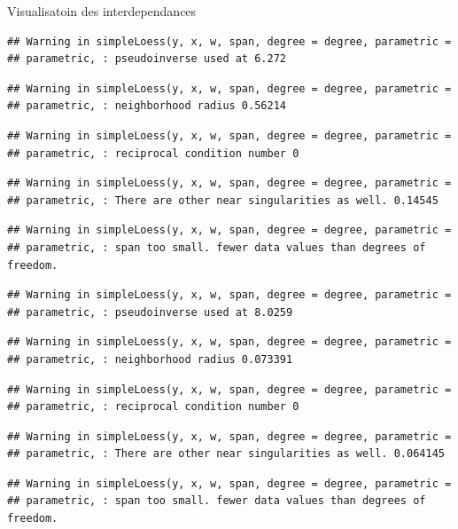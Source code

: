 \documentclass[11pt,ignorenonframetext,]{beamer}
\begin{document}
\begin{frame}[fragile]{Visualisatoin des interdependances}
\begin{verbatim}
## Warning in simpleLoess(y, x, w, span, degree = degree, parametric =
## parametric, : pseudoinverse used at 6.272
\end{verbatim}

\begin{verbatim}
## Warning in simpleLoess(y, x, w, span, degree = degree, parametric =
## parametric, : neighborhood radius 0.56214
\end{verbatim}

\begin{verbatim}
## Warning in simpleLoess(y, x, w, span, degree = degree, parametric =
## parametric, : reciprocal condition number 0
\end{verbatim}

\begin{verbatim}
## Warning in simpleLoess(y, x, w, span, degree = degree, parametric =
## parametric, : There are other near singularities as well. 0.14545
\end{verbatim}

\begin{verbatim}
## Warning in simpleLoess(y, x, w, span, degree = degree, parametric =
## parametric, : span too small. fewer data values than degrees of freedom.
\end{verbatim}

\begin{verbatim}
## Warning in simpleLoess(y, x, w, span, degree = degree, parametric =
## parametric, : pseudoinverse used at 8.0259
\end{verbatim}

\begin{verbatim}
## Warning in simpleLoess(y, x, w, span, degree = degree, parametric =
## parametric, : neighborhood radius 0.073391
\end{verbatim}

\begin{verbatim}
## Warning in simpleLoess(y, x, w, span, degree = degree, parametric =
## parametric, : reciprocal condition number 0
\end{verbatim}

\begin{verbatim}
## Warning in simpleLoess(y, x, w, span, degree = degree, parametric =
## parametric, : There are other near singularities as well. 0.064145
\end{verbatim}

\begin{verbatim}
## Warning in simpleLoess(y, x, w, span, degree = degree, parametric =
## parametric, : span too small. fewer data values than degrees of freedom.
\end{verbatim}


\end{frame}
\end{document}

